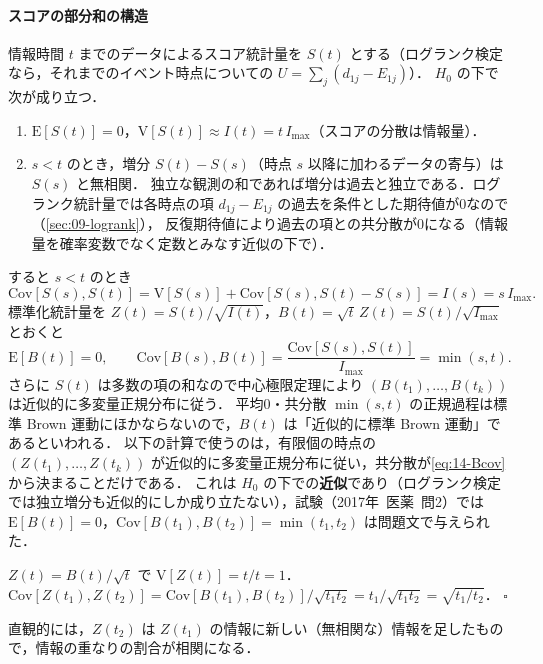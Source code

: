 \documentclass[a4paper,11pt,openany]{ltjsbook}
\newtheorem{meidai}[teigi]{命題}
\newenvironment{proof}[1][証明]{\par\smallskip\noindent{\sffamily\bfseries #1}\quad\ignorespaces}{\nobreak\hfill$\square$\par\medskip}
\newcommand{\tagbox}[2]{\tcbox[on line,boxsep=0.5pt,left=2pt,right=2pt,top=0.5pt,bottom=0.5pt,
  colframe=#1,colback=#1!10,boxrule=0.4pt,arc=1pt]{\scriptsize\bfseries\textcolor{#1}{#2}}}
\newcommand{\Youchui}{\tagbox{bkpurple}{要注意}}
\newcommand{\kakomon}[2]{\mbox{#1年 医薬 問#2}}
\newcommand{\E}{\mathrm{E}}
\newcommand{\V}{\mathrm{V}}
\newcommand{\Cov}{\mathrm{Cov}}
\newcommand{\Corr}{\mathrm{Corr}}
\begin{document}
\paragraph{スコアの部分和の構造}
情報時間 $t$ までのデータによるスコア統計量を $S(t)$ とする（ログランク検定なら，それまでのイベント時点についての $U=\sum_j(d_{1j}-E_{1j})$）．
$H_0$ の下で次が成り立つ．
\begin{enumerate}[label=(\roman*)]
\item $\E[S(t)]=0$，$\V[S(t)]\approx I(t)=t\,I_{\max}$（スコアの分散は情報量）．
\item $s<t$ のとき，増分 $S(t)-S(s)$（時点 $s$ 以降に加わるデータの寄与）は $S(s)$ と無相関．
      独立な観測の和であれば増分は過去と独立である．ログランク統計量では各時点の項 $d_{1j}-E_{1j}$ の過去を条件とした期待値が0なので（\cref{sec:09-logrank}），
      反復期待値により過去の項との共分散が0になる（情報量を確率変数でなく定数とみなす近似の下で）．
\end{enumerate}
すると $s<t$ のとき
\[
\Cov[S(s),S(t)]=\V[S(s)]+\Cov[S(s),S(t)-S(s)]=I(s)=s\,I_{\max}.
\]
標準化統計量を $Z(t)=S(t)/\sqrt{I(t)}$，$B(t)=\sqrt t\,Z(t)=S(t)/\sqrt{I_{\max}}$ とおくと
\begin{equation}
\E[B(t)]=0,\qquad \Cov[B(s),B(t)]=\frac{\Cov[S(s),S(t)]}{I_{\max}}=\min(s,t).\label{eq:14-Bcov}
\end{equation}
さらに $S(t)$ は多数の項の和なので中心極限定理により $(B(t_1),\dots,B(t_k))$ は近似的に多変量正規分布に従う．
平均0・共分散 $\min(s,t)$ の正規過程は標準 Brown 運動にほかならないので，$B(t)$ は「近似的に標準 Brown 運動」であるといわれる．
以下の計算で使うのは，有限個の時点の $(Z(t_1),\dots,Z(t_k))$ が近似的に多変量正規分布に従い，共分散が\cref{eq:14-Bcov}から決まることだけである．
\Youchui これは $H_0$ の下での\textbf{近似}であり（ログランク検定では独立増分も近似的にしか成り立たない），試験（\kakomon{2017}{2}）では $\E[B(t)]=0$，$\Cov[B(t_1),B(t_2)]=\min(t_1,t_2)$ は問題文で与えられた．

\begin{proof}
$Z(t)=B(t)/\sqrt t$ で $\V[Z(t)]=t/t=1$．$\Cov[Z(t_1),Z(t_2)]=\Cov[B(t_1),B(t_2)]/\sqrt{t_1t_2}=t_1/\sqrt{t_1t_2}=\sqrt{t_1/t_2}$．
\end{proof}
直観的には，$Z(t_2)$ は $Z(t_1)$ の情報に新しい（無相関な）情報を足したもので，情報の重なりの割合が相関になる．
\end{document}
